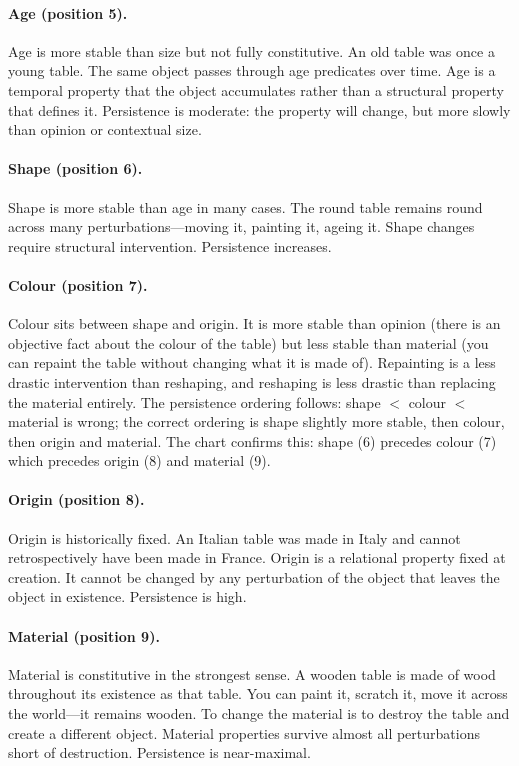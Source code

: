 \documentclass[11pt]{article}
\theoremstyle{rthm}
\theoremstyle{rdef}
\theoremstyle{remark}
\begin{document}
\paragraph{Age (position 5).}
Age is more stable than size but not fully constitutive. An old table was
once a young table. The same object passes through age predicates over time.
Age is a temporal property that the object accumulates rather than a
structural property that defines it. Persistence is moderate: the property
will change, but more slowly than opinion or contextual size.

\paragraph{Shape (position 6).}
Shape is more stable than age in many cases. The round table remains round
across many perturbations---moving it, painting it, ageing it. Shape changes
require structural intervention. Persistence increases.

\paragraph{Colour (position 7).}
Colour sits between shape and origin. It is more stable than opinion (there
is an objective fact about the colour of the table) but less stable than
material (you can repaint the table without changing what it is made of).
Repainting is a less drastic intervention than reshaping, and reshaping is
less drastic than replacing the material entirely. The persistence ordering
follows: shape $<$ colour $<$ material is wrong; the correct ordering is
shape slightly more stable, then colour, then origin and material. The
chart confirms this: shape (6) precedes colour (7) which precedes origin (8)
and material (9).

\paragraph{Origin (position 8).}
Origin is historically fixed. An Italian table was made in Italy and cannot
retrospectively have been made in France. Origin is a relational property
fixed at creation. It cannot be changed by any perturbation of the object
that leaves the object in existence. Persistence is high.

\paragraph{Material (position 9).}
Material is constitutive in the strongest sense. A wooden table is made of
wood throughout its existence as that table. You can paint it, scratch it,
move it across the world---it remains wooden. To change the material is to
destroy the table and create a different object. Material properties survive
almost all perturbations short of destruction. Persistence is near-maximal.
\end{document}
